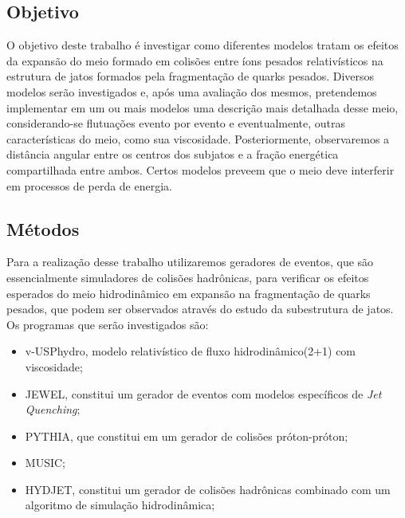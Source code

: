 \subsection{Objetivo}

O objetivo deste trabalho é investigar como diferentes modelos tratam os efeitos da expansão do meio formado em colisões
entre íons pesados relativísticos na estrutura de jatos formados pela fragmentação de quarks pesados. Diversos modelos serão
investigados e, após uma avaliação dos mesmos, pretendemos implementar em um ou mais modelos uma descrição mais detalhada desse meio,
considerando-se flutuações evento por evento e eventualmente, outras características do meio, como sua viscosidade. Posteriormente,
observaremos a distância angular entre os centros dos subjatos e a fração energética compartilhada entre ambos.
Certos modelos \cite{zapp_monte_2009, renk_jet_2014} preveem que o meio deve interferir em processos de perda de energia.

\subsection{Métodos}

Para a realização desse trabalho utilizaremos geradores de eventos, que são essencialmente simuladores
de colisões hadrônicas, para verificar os efeitos esperados do meio hidrodinâmico em expansão na fragmentação
de quarks pesados, que podem ser observados através do estudo da subestrutura de jatos. Os programas que serão
investigados são:

\begin{itemize}
 \item v-USPhydro\cite{noauthor_jacquelyn_nodate,noronha-hostler_event-by-event_2016,noronha-hostler_bulk_2014,noronha-hostler_sensitivity_2016},
 modelo relativístico de fluxo hidrodinâmico(2+1) com viscosidade;
 \item JEWEL\cite{noauthor_jewel_nodate, zapp_jewel_2014}, constitui um gerador de eventos com modelos específicos de \emph{Jet Quenching};
 \item PYTHIA\cite{noauthor_pythia_nodate}, que constitui em um gerador de colisões próton-próton;
 \item MUSIC\cite{noauthor_music_nodate};
 \item HYDJET\cite{lokhtin_hydjet++_2009}, constitui um gerador de colisões hadrônicas combinado com um algoritmo de simulação hidrodinâmica;
\end{itemize}